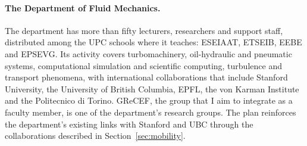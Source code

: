 \documentclass[11pt]{article}
\begin{document}
\paragraph{The Department of Fluid Mechanics.} The department has more than fifty
lecturers, researchers and support staff, distributed among the UPC schools where it
teaches: ESEIAAT, ETSEIB, EEBE and EPSEVG. Its activity covers turbomachinery,
oil-hydraulic and pneumatic systems, computational simulation and scientific computing,
turbulence and transport phenomena, with international collaborations that include
Stanford University, the University of British Columbia, EPFL, the von Karman Institute and
the Politecnico di Torino. GReCEF, the group that I aim to integrate as a faculty member, is one of the department's research
groups. The plan reinforces the department's existing links with Stanford and UBC through
the collaborations described in Section~\ref{sec:mobility}.
\end{document}
